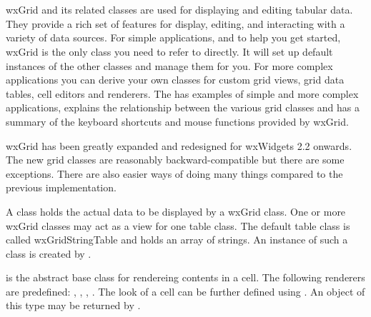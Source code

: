 
\section{}\label{wxgrid}

wxGrid and its related classes are used for displaying and editing tabular
data. They provide a rich set of features for display, editing, and
interacting with a variety of data sources. For simple applications, and to
help you get started, wxGrid is the only class you need to refer to
directly. It will set up default instances of the other classes and manage
them for you. For more complex applications you can derive your own
classes for custom grid views, grid data tables, cell editors and
renderers. The  has
examples of simple and more complex applications, explains the
relationship between the various grid classes and has a summary of the
keyboard shortcuts and mouse functions provided by wxGrid.

wxGrid has been greatly expanded and redesigned for wxWidgets 2.2
onwards. The new grid classes are reasonably backward-compatible
but there are some exceptions. There are also easier ways of doing many things compared to
the previous implementation.

A  class holds the actual
data to be displayed by a wxGrid class. One or more wxGrid classes
may act as a view for one table class. 
The default table class is called wxGridStringTable and
holds an array of strings. An instance of such a class is created
by .

 is the abstract base
class for rendereing contents in a cell. The following renderers are
predefined:
,
,
,
. The
look of a cell can be further defined using .
An object of this type may be returned by .

